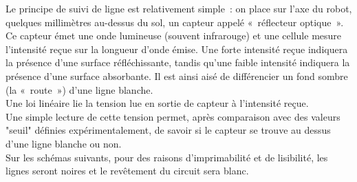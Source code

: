		Le principe de suivi de ligne est relativement simple : on place sur l’axe du robot, quelques millimètres au-dessus du sol, un capteur appelé « réflecteur optique ». Ce capteur émet une onde lumineuse (souvent infrarouge) et une cellule mesure l’intensité reçue sur la longueur d’onde émise. Une forte intensité reçue indiquera la présence d’une surface réfléchissante, tandis qu’une faible intensité indiquera la présence d’une surface absorbante. Il est ainsi aisé de différencier un fond sombre (la « route ») d’une ligne blanche.\\

		Une loi linéaire lie la tension lue en sortie de capteur à l'intensité reçue.\\
		Une simple lecture de cette tension permet, après comparaison avec des valeurs "seuil" définies expérimentalement, de savoir si le capteur se trouve au dessus d'une ligne blanche ou non.\\

		Sur les schémas suivants, pour des raisons d'imprimabilité et de lisibilité, les lignes seront noires et le revêtement du circuit sera blanc.\\

